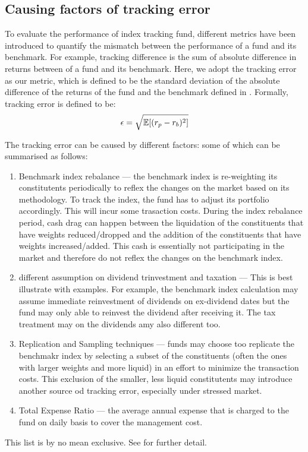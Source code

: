 \subsection{Causing factors of tracking error} 
To evaluate the performance of index tracking fund, different metrics have been introduced to quantify the mismatch between the performance of a fund and its benchmark. For example, tracking difference is the sum of absolute difference in returns between of a fund and its benchmark. Here, we adopt the tracking error as our metric, which is defined to be the standard deviation of the absolute difference of the returns of the fund and the benchmark defined in \cite{BJ13}. Formally, tracking error is defined to be:
\begin{equation}
  \epsilon = \sqrt{\operatorname{\mathbb{E}}[(r_p - r_b)^2]}
\end{equation}

The tracking error can be caused by different factors: some of which can be summarised as follows:
\begin{enumerate}
\item Benchmark index rebalance --- the benchmark index is re-weighting its constitutents periodically to reflex the changes on the market based on its methodology. To track the index, the fund has to adjust its portfolio accordingly. This will incur some trasaction costs. During the index rebalance period, cash drag can happen between the liquidation of the constituents that have weights reduced/dropped and the addition of the constituents that have weights increased/added. This cash is essentially not participating in the market and therefore do not reflex the changes on the benchmark index.
\item different assumption on dividend trinvestment and taxation --- This is best illustrate with examples. For example, the benchmark index calculation may assume immediate reinvestment of dividends on ex-dividend dates but the fund may only able to reinvest the dividend after receiving it. The tax treatment may on the dividends amy also different too.
\item Replication and Sampling techniques --- funds may choose too replicate the benchmakr index by selecting a subset of the constituents (often the ones with larger weights and more liquid) in an effort to minimize the transaction costs. This exclusion of the smaller, less liquid constitutents may introduce another source od tracking error, especially under stressed market.
\item Total Expense Ratio --- the average annual expense that is charged to the fund on daily basis to cover the management cost.
\end{enumerate}
This list is by no mean exclusive. See \cite{BJ13} for further detail.

